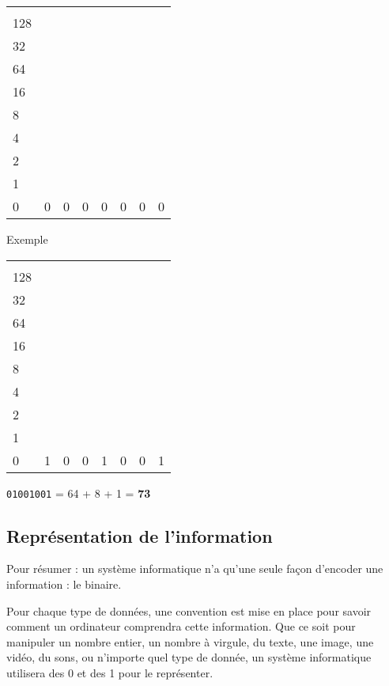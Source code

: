 \begin{center}
	\begin{tabular}{|l|l|l|l|l|l|l|l|}
		\hline
		\makecell[tl]{$2^{7}$         \\ 128} & \makecell[tl]{$2^{6}$\\  32} & \makecell[tl]{$2^{5}$\\ 64} & \makecell[tl]{$2^{4}$\\ 16} & \makecell[tl]{$2^{3}$\\ 8} & \makecell[tl]{$2^{2}$ \\ 4} & \makecell[tl]{$2^{1}$\\ 2} & \makecell[tl]{$2^{0}$ \\1} \\
		\hline
		0 & 0 & 0 & 0 & 0 & 0 & 0 & 0 \\
		\hline
	\end{tabular}
\end{center}
\begin{UPSTIinfor}{Exemple}
	\begin{center}
		\begin{tabular}{|l|l|l|l|l|l|l|l|}
			\hline
			\makecell[tl]{$2^{7}$         \\ 128} & \makecell[tl]{$2^{6}$\\  32} & \makecell[tl]{$2^{5}$\\ 64} & \makecell[tl]{$2^{4}$\\ 16} & \makecell[tl]{$2^{3}$\\ 8} & \makecell[tl]{$2^{2}$ \\ 4} & \makecell[tl]{$2^{1}$\\ 2} & \makecell[tl]{$2^{0}$ \\1} \\
			\hline
			0 & 1 & 0 & 0 & 1 & 0 & 0 & 1 \\
			\hline
		\end{tabular}
	\end{center}
	\texttt{01001001} = 64 + 8 + 1 = \textbf{73}
\end{UPSTIinfor}

\subsection{Représentation de l’information}
Pour résumer : un système informatique n'a qu'une seule façon d'encoder une information : le binaire.

Pour chaque type de données, une convention est mise en place pour savoir comment un ordinateur comprendra cette information.
Que ce soit pour manipuler un nombre entier, un nombre à virgule, du texte, une image, une vidéo, du sons, ou n'importe quel type de donnée, un système informatique utilisera des 0 et des 1 pour le représenter.

